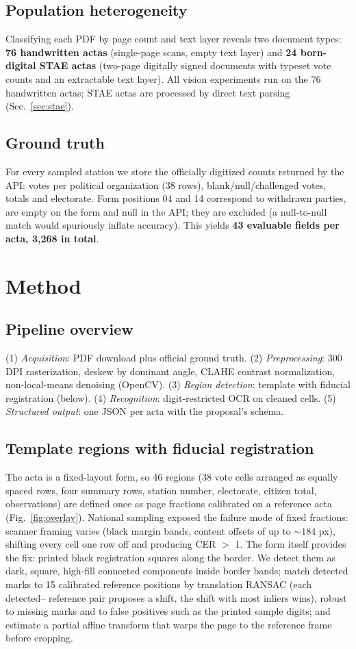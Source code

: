 \documentclass[conference]{IEEEtran}
\begin{document}
\subsection{Population heterogeneity}
Classifying each PDF by page count and text layer reveals two document types:
\textbf{76 handwritten actas} (single-page scans, empty text layer) and
\textbf{24 born-digital STAE actas} (two-page digitally signed documents with
typeset vote counts and an extractable text layer). All vision experiments
run on the 76 handwritten actas; STAE actas are processed by direct text
parsing (Sec.~\ref{sec:stae}).

\subsection{Ground truth}
For every sampled station we store the officially digitized counts returned
by the API: votes per political organization (38 rows), blank/null/challenged
votes, totals and electorate. Form positions 04 and 14 correspond to
withdrawn parties, are empty on the form and null in the API; they are
excluded (a null-to-null match would spuriously inflate accuracy). This
yields \textbf{43 evaluable fields per acta, 3,268 in total}.

\section{Method}
\subsection{Pipeline overview}
(1) \emph{Acquisition}: PDF download plus official ground truth.
(2) \emph{Preprocessing}: 300 DPI rasterization, deskew by dominant angle,
CLAHE contrast normalization, non-local-means denoising (OpenCV).
(3) \emph{Region detection}: template with fiducial registration (below).
(4) \emph{Recognition}: digit-restricted OCR on cleaned cells.
(5) \emph{Structured output}: one JSON per acta with the proposal's schema.

\subsection{Template regions with fiducial registration}
\label{sec:registro}
The acta is a fixed-layout form, so 46 regions (38 vote cells arranged as
equally spaced rows, four summary rows, station number, electorate, citizen
total, observations) are defined once as page fractions calibrated on a
reference acta (Fig.~\ref{fig:overlay}). National sampling exposed the
failure mode of fixed fractions: scanner framing varies (black margin bands,
content offsets of up to ${\sim}184$ px), shifting every cell one row off and
producing CER $>$ 1. The form itself provides the fix: printed black
registration squares along the border. We detect them as dark, square,
high-fill connected components inside border bands; match detected marks to
15 calibrated reference positions by translation RANSAC (each detected--%
reference pair proposes a shift, the shift with most inliers wins), robust to
missing marks and to false positives such as the printed sample digits; and
estimate a partial affine transform that warps the page to the reference
frame before cropping.
\end{document}
